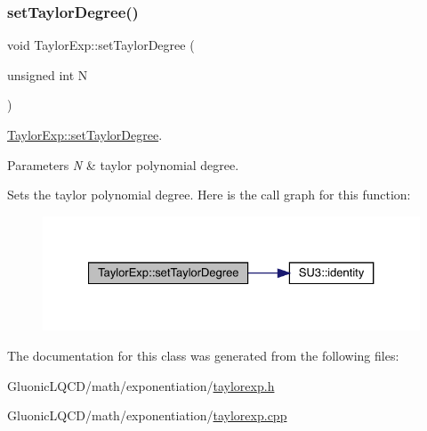 \subsubsection{\texorpdfstring{setTaylorDegree()}{setTaylorDegree()}}
{\footnotesize\ttfamily void Taylor\+Exp\+::set\+Taylor\+Degree (\begin{DoxyParamCaption}\item[{unsigned int}]{N }\end{DoxyParamCaption})}



\mbox{\hyperlink{class_taylor_exp_a6a048363483f372300e412b27f218773}{Taylor\+Exp\+::set\+Taylor\+Degree}}. 


\begin{DoxyParams}{Parameters}
{\em N} & taylor polynomial degree.\\
\hline
\end{DoxyParams}
Sets the taylor polynomial degree. Here is the call graph for this function\+:\nopagebreak
\begin{figure}[H]
\begin{center}
\leavevmode
\includegraphics[width=327pt]{class_taylor_exp_a6a048363483f372300e412b27f218773_cgraph}
\end{center}
\end{figure}


The documentation for this class was generated from the following files\+:\begin{DoxyCompactItemize}
\item 
Gluonic\+L\+Q\+C\+D/math/exponentiation/\mbox{\hyperlink{taylorexp_8h}{taylorexp.\+h}}\item 
Gluonic\+L\+Q\+C\+D/math/exponentiation/\mbox{\hyperlink{taylorexp_8cpp}{taylorexp.\+cpp}}\end{DoxyCompactItemize}
